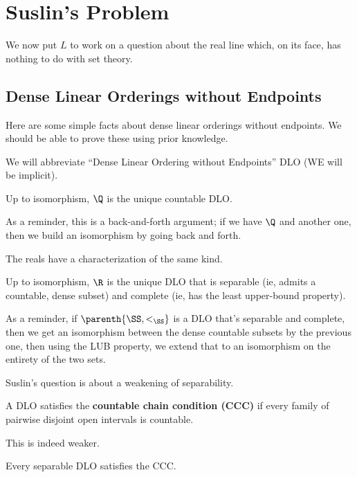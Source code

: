 \section{Suslin's Problem}

We now put $L$ to work on a question about the real line which, on its face, has nothing to do with set theory.

\subsection{Dense Linear Orderings without Endpoints}

Here are some simple facts about dense linear orderings without endpoints. We should be able to prove these using prior knowledge.

We will abbreviate ``Dense Linear Ordering without Endpoints'' DLO (WE will be implicit).

\begin{boxlemma}
    Up to isomorphism, $\Q$ is the unique countable DLO.
\end{boxlemma}

As a reminder, this is a back-and-forth argument; if we have $\Q$ and another one, then we build an isomorphism by going back and forth.

The reals have a characterization of the same kind.

\begin{boxlemma}
    Up to isomorphism, $\R$ is the unique DLO that is separable (ie, admits a countable, dense subset) and complete (ie, has the least upper-bound property).
\end{boxlemma}

As a reminder, if $\parenth{\SS, <_{\SS}}$ is a DLO that's separable and complete, then we get an isomorphism between the dense countable subsets by the previous one, then using the LUB property, we extend that to an isomorphism on the entirety of the two sets.

Suslin's question is about a weakening of separability.

\begin{boxdefinition}
    A DLO satisfies the \textbf{countable chain condition (CCC)} if every family of pairwise disjoint open intervals is countable.
\end{boxdefinition}

This is indeed weaker.

\begin{boxlemma}
    Every separable DLO satisfies the CCC.
\end{boxlemma}


